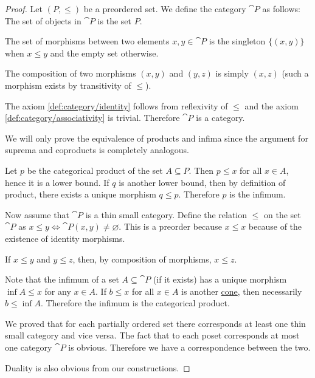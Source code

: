 \begin{proof}
  \Sufficiency Let \( (P, \leq) \) be a preordered set. We define the category \( \cat{P} \) as follows:
   The set of objects in \( \cat{P} \) is the set \( P \).

   The set of morphisms between two elements \( x, y \in \cat{P} \) is the singleton \( \{ (x, y) \} \) when \( x \leq y \) and the empty set otherwise.

   The composition of two morphisms \( (x, y) \) and \( (y, z) \) is simply \( (x, z) \) (such a morphism exists by transitivity of \( \leq \)).

  The axiom \ref{def:category/identity} follows from reflexivity of \( \leq \) and the axiom \ref{def:category/associativity} is trivial. Therefore \( \cat{P} \) is a category.

  We will only prove the equivalence of products and infima since the argument for suprema and coproducts is completely analogous.

  Let \( p \) be the categorical product of the set \( A \subseteq P \). Then \( p \leq x \) for all \( x \in A \), hence it is a lower bound. If \( q \) is another lower bound, then by definition of product, there exists a unique morphism \( q \leq p \). Therefore \( p \) is the infimum.

  \Necessity Now assume that \( \cat{P} \) is a thin small category. Define the relation \( \leq \) on the set \( \cat{P} \) as \( x \leq y \iff \cat{P}(x, y) \neq \varnothing \). This is a preorder because
   \( x \leq x \) because of the existence of identity morphisms.

   If \( x \leq y \) and \( y \leq z \), then, by composition of morphisms, \( x \leq z \).

  Note that the infimum of a set \( A \subseteq \cat{P} \) (if it exists) has a unique morphism \( \inf A \leq x \) for any \( x \in A \). If \( b \leq x \) for all \( x \in A \) is another \hyperref[def:categorical_cone]{cone}, then necessarily \( b \leq \inf A \). Therefore the infimum is the categorical product.

  We proved that for each partially ordered set there corresponds at least one thin small category and vice versa. The fact that to each poset corresponds at most one category \( \cat{P} \) is obvious. Therefore we have a correspondence between the two.

  Duality is also obvious from our constructions.
\end{proof}

